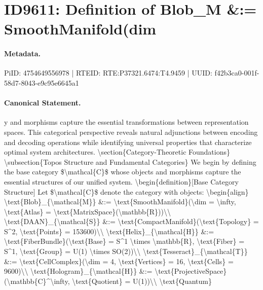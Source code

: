 \section*{ID9611: Definition of Blob\_M \&:= SmoothManifold(dim}
\paragraph{Metadata.}
PiID: 4754649556978 | RTEID: RTE:P37321.6474:T4.9459 | UUID: f42b3ca0-001f-58d7-8043-e9c95e6645a1

\paragraph{Canonical Statement.}
y and morphisms capture the essential transformations between representation spaces. This categorical perspective reveals natural adjunctions between encoding and decoding operations while identifying universal properties that characterize optimal system architectures. \textbackslash{}section\{Category-Theoretic Foundations\} \textbackslash{}subsection\{Topos Structure and Fundamental Categories\} We begin by defining the base category \$\textbackslash{}mathcal\{C\}\$ whose objects and morphisms capture the essential structures of our unified system. \textbackslash{}begin\{definition\}[Base Category Structure] Let \$\textbackslash{}mathcal\{C\}\$ denote the category with objects: \textbackslash{}begin\{align\} \textbackslash{}text\{Blob\}\_\{\textbackslash{}mathcal\{M\}\} \&:= \textbackslash{}text\{SmoothManifold\}(\textbackslash{}dim = \textbackslash{}infty, \textbackslash{}text\{Atlas\} = \textbackslash{}text\{MatrixSpace\}(\textbackslash{}mathbb\{R\}))\textbackslash{}\textbackslash{} \textbackslash{}text\{DAAN\}\_\{\textbackslash{}mathcal\{S\}\} \&:= \textbackslash{}text\{CompactManifold\}(\textbackslash{}text\{Topology\} = S\textasciicircum{}2, \textbackslash{}text\{Points\} = 153600)\textbackslash{}\textbackslash{} \textbackslash{}text\{Helix\}\_\{\textbackslash{}mathcal\{H\}\} \&:= \textbackslash{}text\{FiberBundle\}(\textbackslash{}text\{Base\} = S\textasciicircum{}1 \textbackslash{}times \textbackslash{}mathbb\{R\}, \textbackslash{}text\{Fiber\} = S\textasciicircum{}1, \textbackslash{}text\{Group\} = U(1) \textbackslash{}times SO(2))\textbackslash{}\textbackslash{} \textbackslash{}text\{Tesseract\}\_\{\textbackslash{}mathcal\{T\}\} \&:= \textbackslash{}text\{CellComplex\}(\textbackslash{}dim = 4, \textbackslash{}text\{Vertices\} = 16, \textbackslash{}text\{Cells\} = 9600)\textbackslash{}\textbackslash{} \textbackslash{}text\{Hologram\}\_\{\textbackslash{}mathcal\{H\}\} \&:= \textbackslash{}text\{ProjectiveSpace\}(\textbackslash{}mathbb\{C\}\textasciicircum{}\textbackslash{}infty, \textbackslash{}text\{Quotient\} = U(1))\textbackslash{}\textbackslash{} \textbackslash{}text\{Quantum\}

